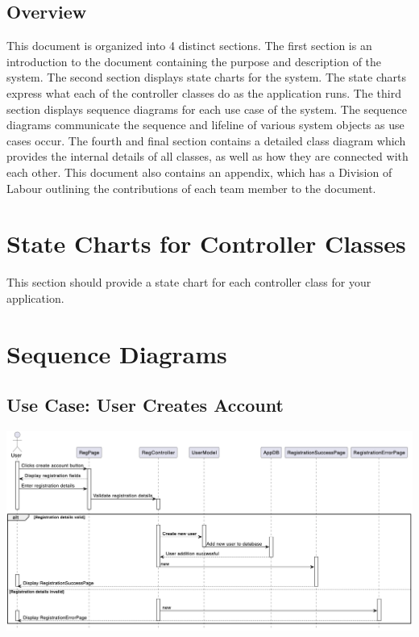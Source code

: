 \documentclass[]{article}
\begin{document}
\subsection{Overview}
\label{sub:overview}
This document is organized into 4 distinct sections. The first section is an introduction to the document containing the purpose and description of the system. The second section displays 
state charts for the system. The state charts express what each of the controller classes do as the application runs. The third section displays sequence diagrams for each use case 
of the system. The sequence diagrams communicate the sequence and lifeline of various system objects as use cases occur. The fourth and final section 
contains a detailed class diagram which provides the internal details of all classes, as well as how they are connected with each other. This document also 
contains an appendix, which has a Division of Labour outlining the contributions of each team member to the document.



\section{State Charts for Controller Classes}
\label{sec:state_charts_for_controller_classes}
This section should provide a state chart for each controller class for your application.

\section{Sequence Diagrams}
\label{sec:sequence_diagrams}
\subsection*{Use Case: User Creates Account}
\includegraphics[scale=0.45]{Sequence Diagrams/GS1.png}
\end{document}

